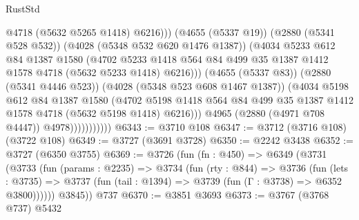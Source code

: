 \begin{lexlean}{RustStd}
\begin{coremodule}
                                    @4718
                                    (@5632 @5265 @1418)
                                    @6216)))
                              (@4655 (@5337 @19))
                              (@2880 (@5341 @528 @532))
                              (@4028 (@5348 @532 @620 @1476 @1387))
                              (@4034
                                @5233
                                @612
                                @84
                                @1387
                                @1580
                                (@4702
                                  @5233
                                  @1418
                                  @564
                                  @84
                                  @499
                                  @35
                                  @1387
                                  @1412
                                  @1578
                                  @4718
                                  (@5632 @5233 @1418)
                                  @6216)))
                            (@4655 (@5337 @83))
                            (@2880 (@5341 @4446 @523))
                            (@4028 (@5348 @523 @608 @1467 @1387))
                            (@4034
                              @5198
                              @612
                              @84
                              @1387
                              @1580
                              (@4702
                                @5198
                                @1418
                                @564
                                @84
                                @499
                                @35
                                @1387
                                @1412
                                @1578
                                @4718
                                (@5632 @5198 @1418)
                                @6216)))
                          @4965
                          (@2880 (@4971 @708 @4447))
                          @4978)))))))))))
@6343 := @3710 @108
@6347 := @3712 (@3716 @108) (@3722 @108)
@6349 := @3727 (@3691 @3728)
@6350 := @2242 @3438
@6352 := @3727 (@6350 @3755)
@6369 := @3726
    (fun (fn : @450) =>
    @6349
      (@3731
        (@3733
          (fun (params : @2235) =>
          @3734
            (fun (rty : @844) =>
            @3736
              (fun (lets : @3735) =>
              @3737 (fun (tail : @1394) => @3739 (fun (Γ : @3738) => @6352 @3800))))))
        @3845))
    @737
@6370 := @3851 @3693
@6373 := @3767 (@3768 @737) @5432

\end{coremodule}
\end{lexlean}
